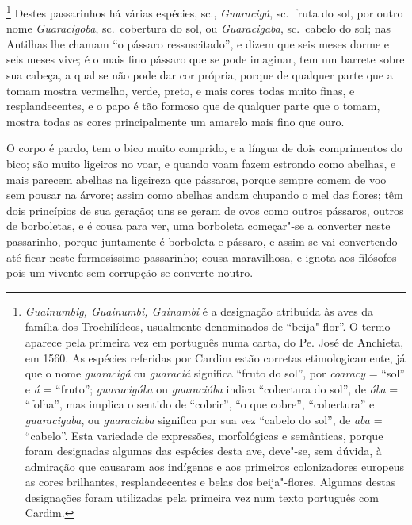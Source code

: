 \begin{linenumbers}
\footnote{ \textit{Guainumbig, Guainumbi,
Gainambi} é a designação atribuída às aves da família dos
Trochilídeos, usualmente denominados de ``beija"-flor''. O termo aparece
pela primeira vez em português numa carta, do Pe. José de
Anchieta, em 1560. As espécies referidas por Cardim estão corretas
etimologicamente, já que o nome \textit{guaracigá} ou \textit{guaraciá}
significa ``fruto do sol'', por \textit{coaracy} = ``sol'' e
\textit{á} = ``fruto''; \textit{guaracigóba} ou \textit{guaracióba}
indica ``cobertura do sol'', de \textit{óba} = ``folha'', mas
implica o sentido de ``cobrir'', ``o que cobre'', ``cobertura'' e
\textit{guaracigaba}, ou \textit{guaraciaba} significa por sua vez
``cabelo do sol'', de \textit{aba} = ``cabelo''. Esta variedade de
expressões, morfológicas e semânticas, porque foram designadas algumas
das espécies desta ave, deve"-se, sem dúvida, à admiração que causaram
aos indígenas e aos primeiros colonizadores europeus as cores
brilhantes, resplandecentes e belas dos beija"-flores. Algumas destas
designações foram utilizadas pela primeira vez num texto português com
Cardim.} Destes passarinhos há várias espécies, sc.,
\textit{Guaracigá}, sc.~fruta do sol, por outro nome
\textit{Guaracigoba}, sc.~cobertura do sol, ou \textit{Guaracigaba}, 
sc.~cabelo do sol; nas Antilhas lhe chamam ``o pássaro ressuscitado'', e
dizem que seis meses dorme e seis meses vive; é o mais fino pássaro que
se pode imaginar, tem um barrete sobre sua cabeça, a qual se não pode
dar cor própria, porque de qualquer parte que a tomam mostra vermelho,
verde, preto, e mais cores todas muito finas, e resplandecentes, e o
papo é tão formoso que de qualquer parte que o tomam, mostra todas as
cores principalmente um amarelo mais fino que ouro.

 O corpo é pardo, tem o bico muito comprido, e a língua de dois
comprimentos do bico; são muito ligeiros no voar, e quando voam fazem
estrondo como abelhas, e mais parecem abelhas na ligeireza que
pássaros, porque sempre comem de voo sem pousar na árvore; assim como
abelhas andam chupando o mel das flores; têm dois princípios de sua
geração; uns se geram de ovos como outros pássaros, outros de
borboletas, e é cousa para ver, uma borboleta começar"-se a converter
neste passarinho, porque juntamente é borboleta e pássaro, e assim se
vai convertendo até ficar neste formosíssimo passarinho; cousa
maravilhosa, e ignota aos filósofos pois um vivente sem corrupção se
converte noutro.


\end{linenumbers}
